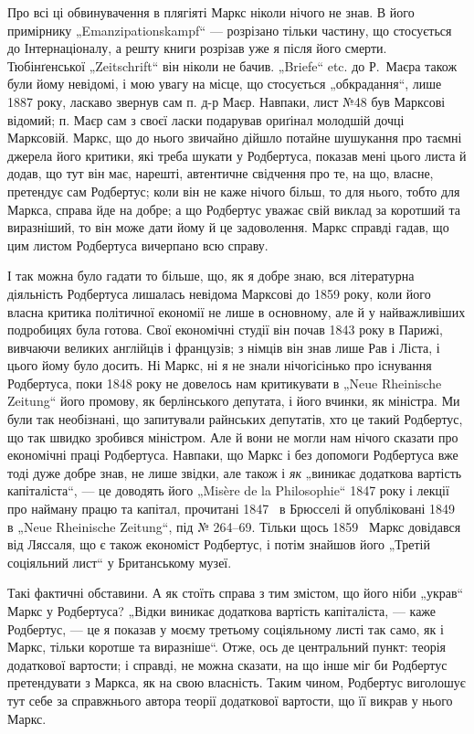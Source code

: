 Про всі ці обвинувачення в плягіяті Маркс ніколи нічого не знав.
В його примірнику „Emanzipationskampf“ — розрізано тільки частину,
що стосується до Інтернаціоналу, а решту книги розрізав уже я після
його смерти. Тюбінґенської „Zeitschrift“ він ніколи не бачив. „Briefe“ etc.
до Р.~Маєра також були йому невідомі, і мою увагу на місце, що стосується
„обкрадання“, лише 1887 року, ласкаво звернув сам п. д-р Маєр.
Навпаки, лист №48 був Марксові відомий; п. Маєр сам з своєї ласки
подарував ориґінал молодшій дочці Марксовій. Маркс, що до нього звичайно
дійшло потайне шушукання про таємні джерела його критики, які
треба шукати у Родбертуса, показав мені цього листа й додав, що тут
він має, нарешті, автентичне свідчення про те, на що, власне, претендує
сам Родбертус; коли він не каже нічого більш, то для нього, тобто для
Маркса, справа йде на добре; а що Родбертус уважає свій виклад за
коротший та виразніший, то він може дати йому й це задоволення.
Маркс справді гадав, що цим листом Родбертуса вичерпано всю справу.

І так можна було гадати то більше, що, як я добре знаю, вся літературна
діяльність Родбертуса лишалась невідома Марксові до 1859 року,
коли його власна критика політичної економії не лише в основному, але
й у найважливіших подробицях була готова. Свої економічні студії він
почав 1843 року в Парижі, вивчаючи великих англійців і французів; з
німців він знав лише Рав і Ліста, і цього йому було досить. Ні Маркс,
ні я не знали нічогісінько про існування Родбертуса, поки 1848 року
не довелось нам критикувати в „Neue Rheinische Zeitung“ його промову,
як берлінського депутата, і його вчинки, як міністра. Ми були так необізнані,
що запитували райнських депутатів, хто це такий Родбертус,
що так швидко зробився міністром. Але й вони не могли нам нічого
сказати про економічні праці Родбертуса. Навпаки, що Маркс і без допомоги
Родбертуса вже тоді дуже добре знав, не лише звідки, але також
і \emph{як} „виникає додаткова вартість капіталіста“, — це доводять його
„Misère de la Philosophie“ 1847 року і лекції про найману працю та капітал,
прочитані 1847~ в Брюсселі й опубліковані 1849~ в „Neue
Rheinische Zeitung“, під № 264--69. Тільки щось 1859~ Маркс довідався
від Ляссаля, що є також економіст Родбертус, і потім знайшов
його „Третій соціяльний лист“ у Британському музеї.

Такі фактичні обставини. А як стоїть справа з тим змістом, що його
ніби „украв“ Маркс у Родбертуса? „Відки виникає додаткова вартість
капіталіста, — каже Родбертус, — це я показав у моєму третьому соціяльному
листі так само, як і Маркс, тільки коротше та виразніше“. Отже,
ось де центральний пункт: теорія додаткової вартости; і справді, не
можна сказати, на що інше міг би Родбертус претендувати з Маркса,
як на свою власність. Таким чином, Родбертус виголошує тут себе за
справжнього автора теорії додаткової вартости, що її викрав у нього Маркс.

